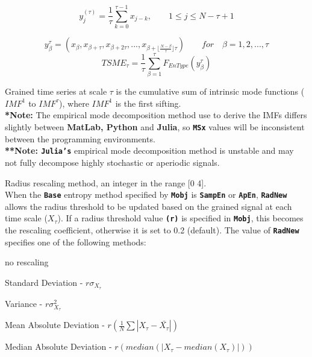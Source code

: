 \documentclass[12pt, a4paper, titlepage, openany]{book}
\begin{document}
\begin{description}[labelsep=1cm, labelwidth=2cm, nosep, style=multiline,leftmargin=3cm]
\begin{description}[labelsep=8em, labelwidth=10em, nosep,style=multiline,leftmargin=3cm]
	\item[\texttt{"modified"}]	
	\[y^{(\tau)}_{j} = \frac{1}{\tau} \sum^{\tau-1}_{k=0} x_{j-k},	\qquad  1\leq j\leq N-\tau+1 \]		
	\item[\texttt{"timeshift"}] \cite{MS10}
	\[y^{\tau}_{\beta} = (x_{\beta}, x_{\beta+\tau}, x_{\beta+2\tau}, ... ,
	 x_{\beta+\lfloor\frac{N-\beta}{\tau}\rfloor \tau})  \qquad for \quad \beta  = 1, 2, ..., \tau \]
	\[TSME_{\tau} = \frac{1}{\tau}\sum^{\tau}_{\beta=1} F_{EnType}(y^{\tau}_{\beta}) \]
	\item[\texttt{"imf"}]	Grained time series at scale $ \tau $ is the cumulative sum of 							intrinsic mode 	functions ($ IMF^1 $ to $ IMF^\tau $), where $ IMF^1 $ is the first sifting. \cite{MS6}\\
			\textbf{*Note:} The empirical mode decomposition method use to derive the IMFs 											differs slightly between \textbf{MatLab, Python} and \textbf{Julia}, so 									\textbf{\texttt{MSx}} values will be inconsistent between the programming environments. \\
				\textbf{**Note: \texttt{Julia's}} empirical mode decomposition method is 								unstable and may not fully decompose highly stochastic or aperiodic signals.\\
	\end{description}
\item[\texttt{RadNew}]			Radius rescaling method, an integer in the range [0 4].\\
				 When the \texttt{\textbf{Base}} entropy method specified by \texttt{\textbf{Mobj}} is \texttt{\textbf{SampEn}} or \texttt{\textbf{ApEn}}, \texttt{\textbf{RadNew}} allows the radius threshold to be updated based on the grained signal at each time scale ($X_\tau$). If a radius threshold value \texttt{\textbf{(r)}} is specified in \texttt{\textbf{Mobj}},  this becomes the rescaling coefficient, otherwise it is set to 0.2 (default). The value of \texttt{\textbf{RadNew}} specifies one of the following methods:
	\begin{description}[labelsep=5em, labelwidth=4em, nosep,style=multiline,leftmargin=2cm]
		\item[0]	no rescaling
		\item[1]    Standard Deviation          - $r\sigma_{X_\tau}$
        \item[2]    Variance                    - $r\sigma_{X_\tau}^2$
        \item[3]    Mean Absolute Deviation     - $r(\frac{1}{N} \sum |X_{\tau} - \bar{X_{\tau}}|) $
        \item[4]    Median Absolute Deviation   - $r(median(|X_{\tau} - median(X_{\tau})|)) $

\end{description}
\end{description}
\end{document}
